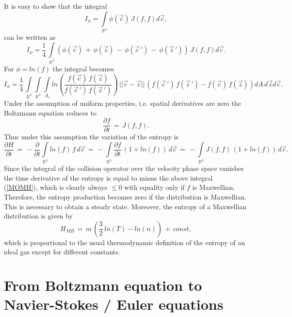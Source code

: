It is easy to show that the integral
\begin{equation}
  I_{\phi} =  \int \limits_{\mathbb{R}^3} \phi(\vec c) \, J(f, f) d\vec c ,\label{I}
\end{equation}
can be written as
\begin{equation}
  I_{\phi} =  \frac{1}{4} \, \int \limits_{\mathbb{R}^3} \left( \phi(\vec c) \, + \, \phi(\vec z) \, - \, \phi(\vec c\, ') \, - \, \phi(\vec z\, ')  \right) \, J(f, f) d\vec c .\label{I4}
\end{equation}
For $\phi=ln(f)$ the integral becomes
\begin{equation}
  I_{\phi} =  \frac{1}{4} \, \int \limits_{\mathbb{R}^3} \int \limits_{\mathbb{R}^3} \int \limits_{A_c} ln\left( \frac{f(\vec c) \, f(\vec z) }{f(\vec c\, ') \, f(\vec z\, ')  }\right) \,||\vec c - \vec z|| \, \left( f(\vec c\, ') \, f(\vec z\, ') - f(\vec c) \, f(\vec z) \right) dA \, d\vec z d\vec c .\label{MOMH}
\end{equation}
Under the assumption of uniform properties, i.e. spatial derivatives are zero the Boltzmann equation reduces to 
\begin{equation}
  \frac{\partial{f}}{\partial{t}} \, = \, J(f, f).\nonumber
\end{equation}
Thus under this assumption the variation of the entropy is
\begin{equation}
  \frac{\partial{H}}{\partial{t}} \, = \,  - \frac{\partial{}}{\partial{t}}\int \limits_{\mathbb{R}^3}  ln(f) \,f \, d\vec c\, = \,  - \int \limits_{\mathbb{R}^3} \frac{\partial{f}}{\partial{t}} \,\left( 1 + ln(f) \right) \, d\vec c\, = \,  - \int \limits_{\mathbb{R}^3} J(f, f) \,\left( 1 + ln(f) \right) \, d\vec c.\nonumber
\end{equation}
Since the integral of the collision operator over the velocity phase space vanishes the time derivative of the entropy is equal to minus the above integral (\ref{MOMH}), which is clearly always $\le 0$ with equality only if $f$ is Maxwellian. Therefore, the entropy production becomes zero if the distribution is Maxwellian. This is necessary to obtain a steady state. Moreover, the entropy of a Maxwellian distribution is given by
\begin{equation}
  H_{MB} \, = \, m \, \left( \frac{3}{2} \, ln(T) - ln(n) \right) \,+ \,const,\nonumber
\end{equation}
which is proportional to the usual thermodynamic definition of the entropy of an ideal gas except for different constants.

\section{From Boltzmann equation to Navier-Stokes / Euler equations}

